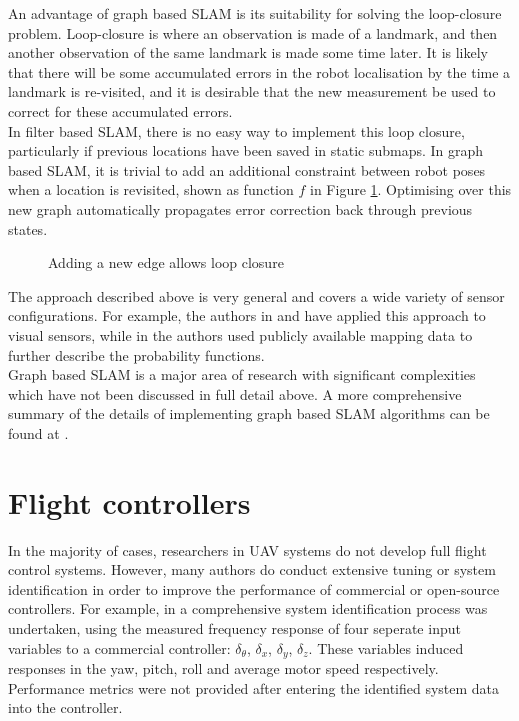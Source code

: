 \documentclass[capstone_report.tex]{subfiles}
\begin{document}
An advantage of graph based SLAM is its suitability for solving the loop-closure problem. Loop-closure is where an observation is made of a landmark, and then another observation of the same landmark is made some time later. It is likely that there will be some accumulated errors in the robot localisation by the time a landmark is re-visited, and it is desirable that the new measurement be used to correct for these accumulated errors.\\

In filter based SLAM, there is no easy way to implement this loop closure, particularly if previous locations have been saved in static submaps. In graph based SLAM, it is trivial to add an additional constraint between robot poses when a location is revisited, shown as function $f$ in Figure \ref{fig:loopClose2}. Optimising over this new graph automatically propagates error correction back through previous states.

\begin{figure}[H]
\centering
  
  \caption{Adding a new edge allows loop closure\label{fig:loopClose2}}
\end{figure}

The approach described above is very general and covers a wide variety of sensor configurations. For example, the authors in \cite{hong} and \cite{annaiyan} have applied this approach to visual sensors, while in \cite{vysotska} the authors used publicly available mapping data to further describe the probability functions. \\

Graph based SLAM is a major area of research with significant complexities which have not been discussed in full detail above. A more comprehensive summary of the details of implementing graph based SLAM algorithms can be found at \cite{grisetti}. 

\section{Flight controllers}
In the majority of cases, researchers in UAV systems do not develop full flight control systems. However, many authors do conduct extensive tuning or system identification in order to improve the performance of commercial or open-source controllers. For example, in \cite{feicui} a comprehensive system identification process was undertaken, using the measured frequency response of four seperate input variables to a commercial controller: $\delta_\theta$, $\delta_x$, $\delta_y$, $\delta_z$. These variables induced responses in the yaw, pitch, roll and average motor speed respectively. Performance metrics were not provided after entering the identified system data into the controller.\\
\end{document}
